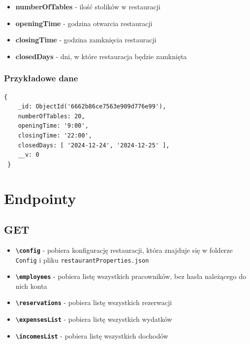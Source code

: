 \documentclass[12pt]{article}
\begin{document}
\begin{itemize}
	\item \textbf{numberOfTables} - ilość stolików w restauracji
	\item \textbf{openingTime} - godzina otwarcia restauracji
	\item \textbf{closingTime} - godzina zamknięcia restauracji
	\item \textbf{closedDays} - dni, w które restauracja będzie zamknięta
\end{itemize}

\subsubsection{Przykładowe dane}
\begin{lstlisting}[]
 {
    _id: ObjectId('6662b86ce7563e909d776e99'),
    numberOfTables: 20,
    openingTime: '9:00',
    closingTime: '22:00',
    closedDays: [ '2024-12-24', '2024-12-25' ],
    __v: 0
 }
\end{lstlisting}

\newpage
\section{Endpointy}
\subsection{GET}
\begin{itemize}
    \item \textbf{\texttt{\textbackslash config}} - pobiera konfigurację restauracji, która znajduje się w folderze \texttt{Config} i pliku \texttt{restaurantProperties.json}
    \item \textbf{\texttt{\textbackslash employees}} - pobiera listę wszystkich pracowników, bez hasła należącego do nich konta
    \item \textbf{\texttt{\textbackslash reservations}} - pobiera listę wszystkich rezerwacji
    \item \textbf{\texttt{\textbackslash expensesList}} - pobiera listę wszystkich wydatków
    \item \textbf{\texttt{\textbackslash incomesList}} - pobiera listę wszystkich dochodów
\end{itemize}
\end{document}
